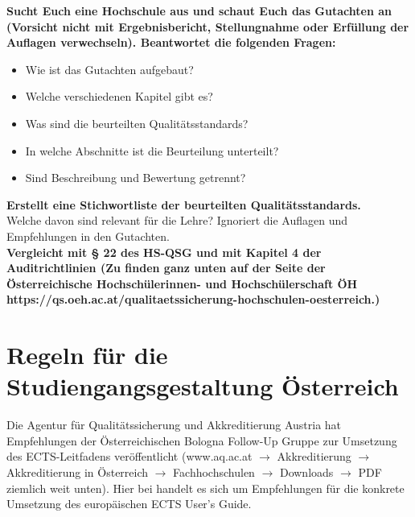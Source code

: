 \documentclass{scrartcl}
\begin{document}
\vspace{0.5 cm}
\textbf{Sucht Euch eine Hochschule aus und schaut Euch das Gutachten an (Vorsicht nicht mit Ergebnisbericht, Stellungnahme oder Erfüllung der Auflagen verwechseln). Beantwortet die folgenden Fragen:}
\begin{itemize}
\item Wie ist das Gutachten aufgebaut?
\item Welche verschiedenen Kapitel gibt es?
\item Was sind die beurteilten Qualitätsstandards?
\item In welche Abschnitte ist die Beurteilung unterteilt?
\item Sind Beschreibung und Bewertung getrennt?

\end{itemize}
\vspace{0.5 cm}
\textbf{Erstellt eine Stichwortliste der beurteilten Qualitätsstandards.\\}
Welche davon sind relevant für die Lehre?
Ignoriert die Auflagen und Empfehlungen in den Gutachten.\\ 

\vspace{0.5 cm}
 \textbf{Vergleicht mit § 22 des HS-QSG und mit Kapitel 4 der Auditrichtlinien (Zu finden ganz unten auf der Seite der Österreichische Hochschülerinnen- und Hochschülerschaft ÖH\\
https://qs.oeh.ac.at/qualitaetssicherung-hochschulen-oesterreich.)}

\newpage
\section*{Regeln für die Studiengangsgestaltung Österreich}
Die Agentur für Qualitätssicherung und Akkreditierung Austria hat Empfehlungen der Österreichischen Bologna Follow-Up Gruppe zur Umsetzung des ECTS-Leitfadens veröffentlicht (www.aq.ac.at $\rightarrow$ Akkreditierung  $\rightarrow$ Akkreditierung in Österreich  $\rightarrow$ Fachhochschulen  $\rightarrow$ Downloads  $\rightarrow$ PDF ziemlich weit unten). Hier bei handelt es sich um Empfehlungen für die konkrete Umsetzung des europäischen ECTS User's Guide.
\vspace{0.5 cm}
\end{document}
